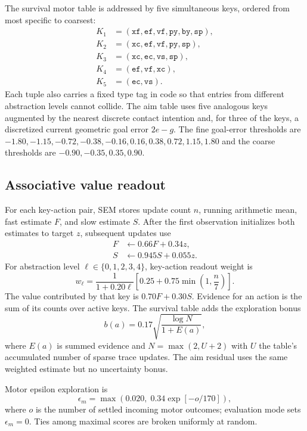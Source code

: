 \documentclass[10pt,twocolumn]{article}
\begin{document}
The survival motor table is addressed by five simultaneous keys, ordered from most specific to coarsest:
\begin{align*}
K_1 &= (\texttt{xf},\texttt{ef},\texttt{vf},\texttt{py},\texttt{by},\texttt{sp}),\\
K_2 &= (\texttt{xc},\texttt{ef},\texttt{vf},\texttt{py},\texttt{sp}),\\
K_3 &= (\texttt{xc},\texttt{ec},\texttt{vs},\texttt{sp}),\\
K_4 &= (\texttt{ef},\texttt{vf},\texttt{xc}),\\
K_5 &= (\texttt{ec},\texttt{vs}).
\end{align*}
Each tuple also carries a fixed type tag in code so that entries from different abstraction levels cannot collide. The aim table uses five analogous keys augmented by the nearest discrete contact intention and, for three of the keys, a discretized current geometric goal error $2e-g$. The fine goal-error thresholds are $-1.80,-1.15,-0.72,-0.38,-0.16,0.16,0.38,0.72,1.15,1.80$ and the coarse thresholds are $-0.90,-0.35,0.35,0.90$.

\subsection{Associative value readout}
For each key-action pair, SEM stores update count $n$, running arithmetic mean, fast estimate $F$, and slow estimate $S$. After the first observation initializes both estimates to target $z$, subsequent updates use
\begin{align}
F &\leftarrow 0.66F+0.34z,\\
S &\leftarrow 0.945S+0.055z.
\end{align}
For abstraction level $\ell\in\{0,1,2,3,4\}$, key-action readout weight is
\begin{equation}
w_{\ell}=\frac{1}{1+0.20\ell}\left[0.25+0.75\min\left(1,\frac{n}{7}\right)\right].
\end{equation}
The value contributed by that key is $0.70F+0.30S$. Evidence for an action is the sum of its counts over active keys. The survival table adds the exploration bonus
\begin{equation}
b(a)=0.17\sqrt{\frac{\log N}{1+E(a)}},
\end{equation}
where $E(a)$ is summed evidence and $N=\max(2,U+2)$ with $U$ the table's accumulated number of sparse trace updates. The aim residual uses the same weighted estimate but no uncertainty bonus.

Motor epsilon exploration is
\begin{equation}
\epsilon_m=\max\left(0.020,\;0.34\exp[-o/170]\right),
\end{equation}
where $o$ is the number of settled incoming motor outcomes; evaluation mode sets $\epsilon_m=0$. Ties among maximal scores are broken uniformly at random.
\end{document}
